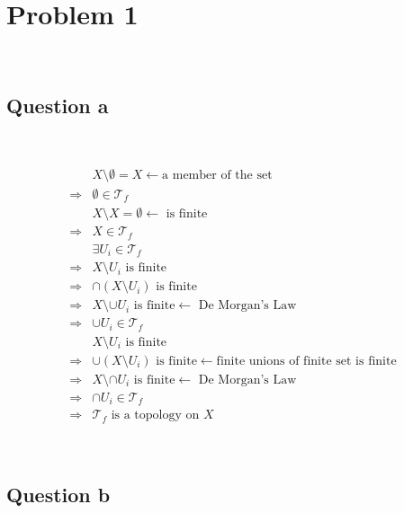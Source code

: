 \documentclass{article}
\begin{document}
\section*{Problem 1}

~

\subsection*{Question a}

~

\begin{equation*}
    \begin{split}
        &X\setminus \emptyset=X\leftarrow\text{a member of the set}\\
        \Rightarrow&\emptyset\in \mathcal{T}_f\\
        &X\setminus X=\emptyset\leftarrow \text{ is finite}\\
        \Rightarrow&X\in\mathcal{T}_f\\
        &\exists U_i\in \mathcal{T}_f\\
        \Rightarrow&X\setminus U_i \text{ is finite}\\
        \Rightarrow&\cap(X\setminus U_i)\text{ is finite}\\
        \Rightarrow&X\setminus \cup U_i\text{ is finite}\leftarrow \text{ De Morgan's Law}\\
        \Rightarrow&\cup U_i\in \mathcal{T}_f\\
        &X\setminus U_i \text{ is finite}\\
        \Rightarrow&\cup(X\setminus U_i)\text{ is finite}\leftarrow\text{finite unions of finite set is finite}\\
        \Rightarrow&X\setminus \cap U_i\text{ is finite}\leftarrow \text{ De Morgan's Law}\\
        \Rightarrow&\cap U_i\in \mathcal{T}_f\\
        \Rightarrow& \mathcal{T}_f\text { is a topology on }X
    \end{split}
\end{equation*}

~

\subsection*{Question b}

~
\end{document}
